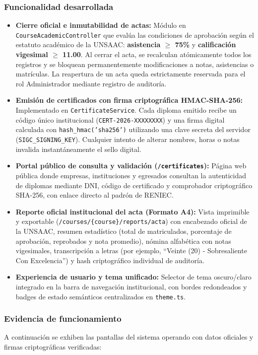 \subsubsection{Funcionalidad desarrollada}
\begin{itemize}[nosep]
    \item \textbf{Cierre oficial e inmutabilidad de actas:} Módulo en \texttt{CourseAcademicController} que evalúa las condiciones de aprobación según el estatuto académico de la UNSAAC: \textbf{asistencia $\ge$ 75\%} y \textbf{calificación vigesimal $\ge$ 11.00}. Al cerrar el acta, se recalculan atómicamente todos los registros y se bloquean permanentemente modificaciones a notas, asistencias o matrículas. La reapertura de un acta queda estrictamente reservada para el rol Administrador mediante registro de auditoría.
    \item \textbf{Emisión de certificados con firma criptográfica HMAC-SHA-256:} Implementado en \texttt{CertificateService}. Cada diploma emitido recibe un código único institucional (\texttt{CERT-2026-XXXXXXXX}) y una firma digital calculada con \texttt{hash\_hmac('sha256')} utilizando una clave secreta del servidor (\texttt{SIGC\_SIGNING\_KEY}). Cualquier intento de alterar nombres, horas o notas invalida instantáneamente el sello digital.
    \item \textbf{Portal público de consulta y validación (\texttt{/certificates}):} Página web pública donde empresas, instituciones y egresados consultan la autenticidad de diplomas mediante DNI, código de certificado y comprobador criptográfico SHA-256, con enlace directo al padrón de RENIEC.
    \item \textbf{Reporte oficial institucional del acta (Formato A4):} Vista imprimible y exportable (\texttt{/courses/\{course\}/reports/acta}) con encabezado oficial de la UNSAAC, resumen estadístico (total de matriculados, porcentaje de aprobación, reprobados y nota promedio), nómina alfabética con notas vigesimales, transcripción a letras (por ejemplo, \enquote{Veinte (20) - Sobresaliente Con Excelencia}) y hash criptográfico individual de auditoría.
    \item \textbf{Experiencia de usuario y tema unificado:} Selector de tema oscuro/claro integrado en la barra de navegación institucional, con bordes redondeados y badges de estado semánticos centralizados en \texttt{theme.ts}.
\end{itemize}

\subsubsection{Evidencia de funcionamiento}
A continuación se exhiben las pantallas del sistema operando con datos oficiales y firmas criptográficas verificadas:

